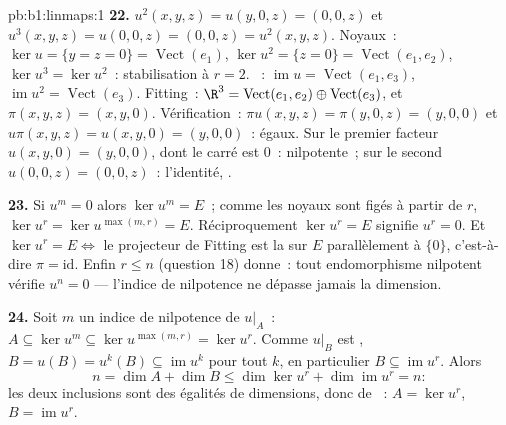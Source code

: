 \begin{solution}{pb:b1:linmaps:1}
\textbf{22.} $u^2(x,y,z) = u(y, 0, z) = (0, 0, z)$ et
$u^3(x,y,z) = u(0,0,z) = (0,0,z) = u^2(x,y,z)$. Noyaux~: $\ker u
= \{y = z = 0\} = \operatorname{Vect}(e_1)$, $\ker u^2 = \{z =
0\} = \operatorname{Vect}(e_1, e_2)$, $\ker u^3 = \ker u^2$~:
stabilisation à $r = 2$. ~: $\operatorname{im} u =
\operatorname{Vect}(e_1, e_3)$, $\operatorname{im} u^2 =
\operatorname{Vect}(e_3)$. Fitting~: $\R^3 =
\operatorname{Vect}(e_1, e_2) \oplus \operatorname{Vect}(e_3)$,
et $\pi(x, y, z) = (x, y, 0)$. Vérification~: $\pi u(x,y,z) = \pi(y, 0,
z) = (y, 0, 0)$ et $u\pi(x,y,z) = u(x, y, 0) = (y, 0, 0)$~:
égaux. Sur le premier facteur $u(x, y, 0) = (y, 0, 0)$, dont le
carré est $0$~: nilpotente~; sur le second $u(0,0,z) = (0,0,z)$~:
l'identité, .

\textbf{23.} Si $u^m = 0$ alors $\ker u^m = E$~; comme les noyaux sont
figés à partir de $r$, $\ker u^{r} = \ker u^{\max(m, r)} = E$.
Réciproquement $\ker u^{r} = E$ signifie $u^{r} = 0$. Et $\ker u^{r} =
E \iff$ le projecteur de Fitting est la  sur $E$ parallèlement à $\{0\}$, c'est-à-dire
$\pi = \mathrm{id}$. Enfin $r \leq n$ (question 18) donne~:
tout endomorphisme nilpotent vérifie $u^{n} = 0$ --- l'indice
de nilpotence ne dépasse jamais la dimension.

\textbf{24.} Soit $m$ un indice de nilpotence de $u|_A$~: $A
\subseteq \ker u^{m} \subseteq \ker u^{\max(m,r)} = \ker u^{r}$.
Comme $u|_B$ est , $B = u(B) = u^{k}(B) \subseteq
\operatorname{im} u^{k}$ pour tout $k$, en particulier $B
\subseteq \operatorname{im} u^{r}$. Alors
\[
n = \dim A + \dim B \leq \dim\ker u^{r} +
\dim\operatorname{im} u^{r} = n :
\]
les deux inclusions sont des égalités de dimensions, donc de
~: $A = \ker u^{r}$, $B = \operatorname{im} u^{r}$.


\end{solution}
